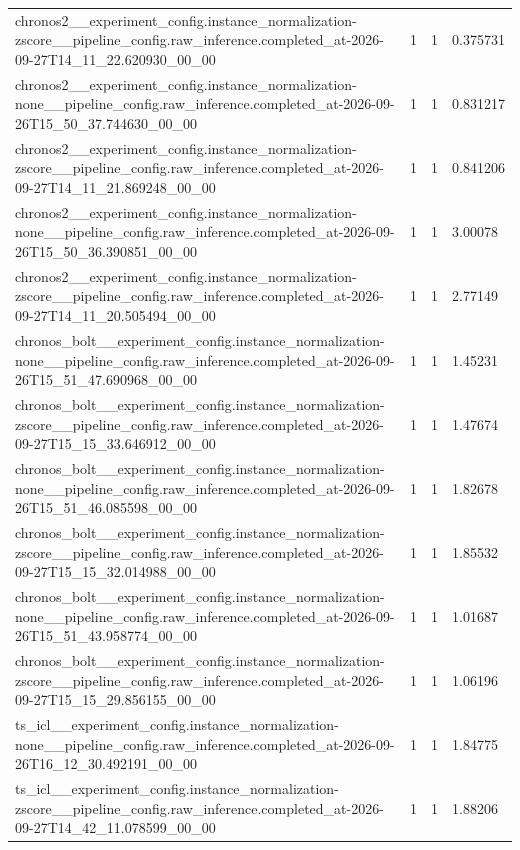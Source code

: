 \begin{tabular}{llll}
chronos2\_\_experiment\_config.instance\_normalization-zscore\_\_pipeline\_config.raw\_inference.completed\_at-2026-09-27T14\_11\_22.620930\_00\_00 & 1 & 1 & 0.375731 \\
chronos2\_\_experiment\_config.instance\_normalization-none\_\_pipeline\_config.raw\_inference.completed\_at-2026-09-26T15\_50\_37.744630\_00\_00 & 1 & 1 & 0.831217 \\
chronos2\_\_experiment\_config.instance\_normalization-zscore\_\_pipeline\_config.raw\_inference.completed\_at-2026-09-27T14\_11\_21.869248\_00\_00 & 1 & 1 & 0.841206 \\
chronos2\_\_experiment\_config.instance\_normalization-none\_\_pipeline\_config.raw\_inference.completed\_at-2026-09-26T15\_50\_36.390851\_00\_00 & 1 & 1 & 3.00078 \\
chronos2\_\_experiment\_config.instance\_normalization-zscore\_\_pipeline\_config.raw\_inference.completed\_at-2026-09-27T14\_11\_20.505494\_00\_00 & 1 & 1 & 2.77149 \\
chronos\_bolt\_\_experiment\_config.instance\_normalization-none\_\_pipeline\_config.raw\_inference.completed\_at-2026-09-26T15\_51\_47.690968\_00\_00 & 1 & 1 & 1.45231 \\
chronos\_bolt\_\_experiment\_config.instance\_normalization-zscore\_\_pipeline\_config.raw\_inference.completed\_at-2026-09-27T15\_15\_33.646912\_00\_00 & 1 & 1 & 1.47674 \\
chronos\_bolt\_\_experiment\_config.instance\_normalization-none\_\_pipeline\_config.raw\_inference.completed\_at-2026-09-26T15\_51\_46.085598\_00\_00 & 1 & 1 & 1.82678 \\
chronos\_bolt\_\_experiment\_config.instance\_normalization-zscore\_\_pipeline\_config.raw\_inference.completed\_at-2026-09-27T15\_15\_32.014988\_00\_00 & 1 & 1 & 1.85532 \\
chronos\_bolt\_\_experiment\_config.instance\_normalization-none\_\_pipeline\_config.raw\_inference.completed\_at-2026-09-26T15\_51\_43.958774\_00\_00 & 1 & 1 & 1.01687 \\
chronos\_bolt\_\_experiment\_config.instance\_normalization-zscore\_\_pipeline\_config.raw\_inference.completed\_at-2026-09-27T15\_15\_29.856155\_00\_00 & 1 & 1 & 1.06196 \\
ts\_icl\_\_experiment\_config.instance\_normalization-none\_\_pipeline\_config.raw\_inference.completed\_at-2026-09-26T16\_12\_30.492191\_00\_00 & 1 & 1 & 1.84775 \\
ts\_icl\_\_experiment\_config.instance\_normalization-zscore\_\_pipeline\_config.raw\_inference.completed\_at-2026-09-27T14\_42\_11.078599\_00\_00 & 1 & 1 & 1.88206 \\

\end{tabular}
